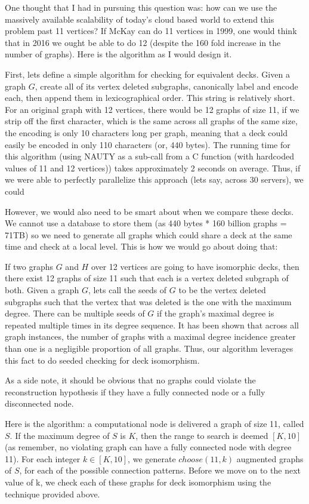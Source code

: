 One thought that I had in pursuing this question was: how can we use the massively available scalability of today's cloud based world to extend this problem past 11 vertices?
If McKay can do 11 vertices in 1999, one would think that in 2016 we ought be able to do 12 (despite the 160 fold increase in the number of graphs).
Here is the algorithm as I would design it.

First, lets define a simple algorithm for checking for equivalent decks.
Given a graph $G$, create all of its vertex deleted subgraphs, canonically label and encode each, then append them in lexicographical order.
This string is relatively short.
For an original graph with 12 vertices, there would be 12 graphs of size 11, if we strip off the first character, which is the same across all graphs of the same size, the encoding is only 10 characters long per graph, meaning that a deck could easily be encoded in only 110 characters (or, 440 bytes).
The running time for this algorithm (using NAUTY as a sub-call from a C function (with hardcoded values of 11 and 12 vertices)) takes approximately 2 seconds on average.
Thus, if we were able to perfectly parallelize this approach (lets say, across 30 servers), we could



However, we would also need to be smart about when we compare these decks.
We cannot use a database to store them (as 440 bytes * 160 billion graphs = 71TB)
so we need to generate all graphs which could share a deck at the same time and check at a local level.
This is how we would go about doing that:

If two graphs $G$ and $H$ over 12 vertices are going to have isomorphic decks, then there exist 12 graphs of size 11 such that each is a vertex deleted subgraph of both.
Given a graph $G$, lets call the seeds of $G$ to be the vertex deleted subgraphs such that the vertex that was deleted is the one with the maximum degree.
There can be multiple seeds of $G$ if the graph's maximal degree is repeated multiple times in its degree sequence.
It has been shown that across all graph instances, the number of graphs with a maximal degree incidence greater than one is a negligible proportion of all graphs.
Thus, our algorithm leverages this fact to do seeded checking for deck isomorphism.

As a side note, it should be obvious that no graphs could violate the reconstruction hypothesis if they have a fully connected node or a fully disconnected node.

Here is the algorithm: a computational node is delivered a graph of size 11, called $S$.
If the maximum degree of $S$ is $K$, then the range to search is deemed $[K, 10]$ (as remember, no violating graph can have a fully connected node with degree 11).
For each integer $k \in [K, 10]$, we generate $choose(11, k)$ augmented graphs of $S$, for each of the possible connection patterns.
Before we move on to the next value of k, we check each of these graphs for deck isomorphism using the technique provided above.

